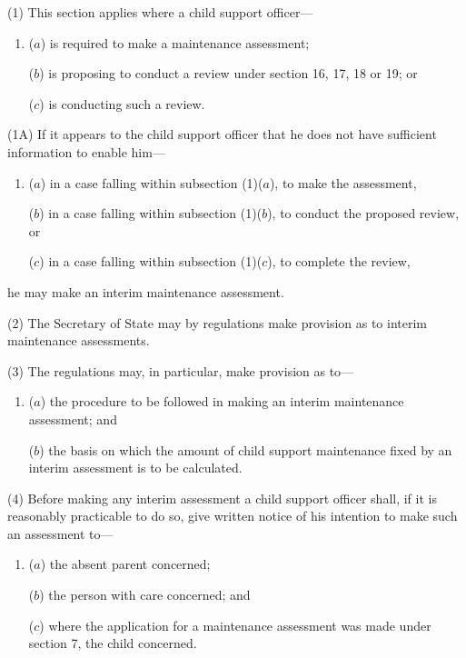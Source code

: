 \documentclass[12pt,a4paper]{article}
\begin{document}

(1) This section applies where a child support officer—
\begin{enumerate}\item[]
($a$) is required to make a maintenance assessment;

($b$) is proposing to conduct a review under section 16, 17, 18 or 19; or

($c$) is conducting such a review.
\end{enumerate}

(1A) If it appears to the child support officer that he does not have sufficient information to enable him—
\begin{enumerate}\item[]
($a$) in a case falling within subsection (1)($a$), to make the assessment,

($b$) in a case falling within subsection (1)($b$), to conduct the proposed review, or

($c$) in a case falling within subsection (1)($c$), to complete the review,
\end{enumerate}
he may make an interim maintenance assessment.

(2) The Secretary of State may by regulations make provision as to interim maintenance assessments.

(3) The regulations may, in particular, make provision as to—
\begin{enumerate}\item[]
($a$) the procedure to be followed in making an interim maintenance assessment; and

($b$) the basis on which the amount of child support maintenance fixed by an interim assessment is to be calculated.
\end{enumerate}

(4) Before making any interim assessment a child support officer shall, if it is reasonably practicable to do so, give written notice of his intention to make such an assessment to—
\begin{enumerate}\item[]
($a$) the absent parent concerned;

($b$) the person with care concerned; and

($c$) where the application for a maintenance assessment was made under section 7, the child concerned.
\end{enumerate}
\end{document}
